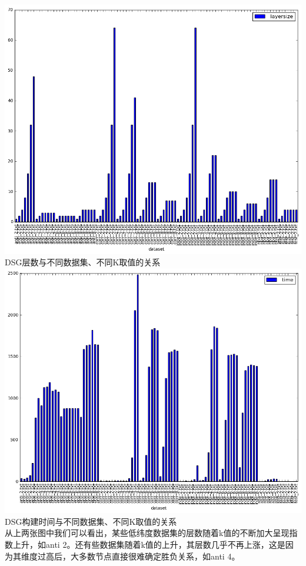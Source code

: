 \documentclass{article}
\begin{document}
\begin{CJK}{UTF8}{gbsn}
\includegraphics[scale=0.4]{pics/k_layer_size.png}\\
DSG层数与不同数据集、不同K取值的关系\\
\includegraphics[scale=0.4]{pics/k_layer_time.png}
\\DSG构建时间与不同数据集、不同K取值的关系\\
从上两张图中我们可以看出，某些低纬度数据集的层数随着k值的不断加大呈现指数上升，如anti 2。还有些数据集随着k值的上升，其层数几乎不再上涨，这是因为其维度过高后，大多数节点直接很难确定胜负关系，如anti 4。\\

\end{CJK}
\end{document}
